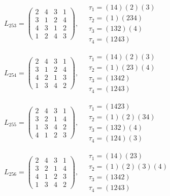 $L_{253} = \begin{pmatrix} 2 & 4 & 3 & 1 \\ 3 & 1 & 2 & 4 \\ 4 & 3 & 1 & 2 \\ 1 & 2 & 4 & 3 \end{pmatrix}, \quad \begin{matrix} \tau_{1} = (1 4)(2)(3) \\ \tau_{2} = (1)(2 3 4) \\ \tau_{3} = (1 3 2)(4) \\ \tau_{4} = (1 2 4 3) \end{matrix}$

$L_{254} = \begin{pmatrix} 2 & 4 & 3 & 1 \\ 3 & 1 & 2 & 4 \\ 4 & 2 & 1 & 3 \\ 1 & 3 & 4 & 2 \end{pmatrix}, \quad \begin{matrix} \tau_{1} = (1 4)(2)(3) \\ \tau_{2} = (1)(2 3)(4) \\ \tau_{3} = (1 3 4 2) \\ \tau_{4} = (1 2 4 3) \end{matrix}$

$L_{255} = \begin{pmatrix} 2 & 4 & 3 & 1 \\ 3 & 2 & 1 & 4 \\ 1 & 3 & 4 & 2 \\ 4 & 1 & 2 & 3 \end{pmatrix}, \quad \begin{matrix} \tau_{1} = (1 4 2 3) \\ \tau_{2} = (1)(2)(3 4) \\ \tau_{3} = (1 3 2)(4) \\ \tau_{4} = (1 2 4)(3) \end{matrix}$

$L_{256} = \begin{pmatrix} 2 & 4 & 3 & 1 \\ 3 & 2 & 1 & 4 \\ 4 & 1 & 2 & 3 \\ 1 & 3 & 4 & 2 \end{pmatrix}, \quad \begin{matrix} \tau_{1} = (1 4)(2 3) \\ \tau_{2} = (1)(2)(3)(4) \\ \tau_{3} = (1 3 4 2) \\ \tau_{4} = (1 2 4 3) \end{matrix}$

